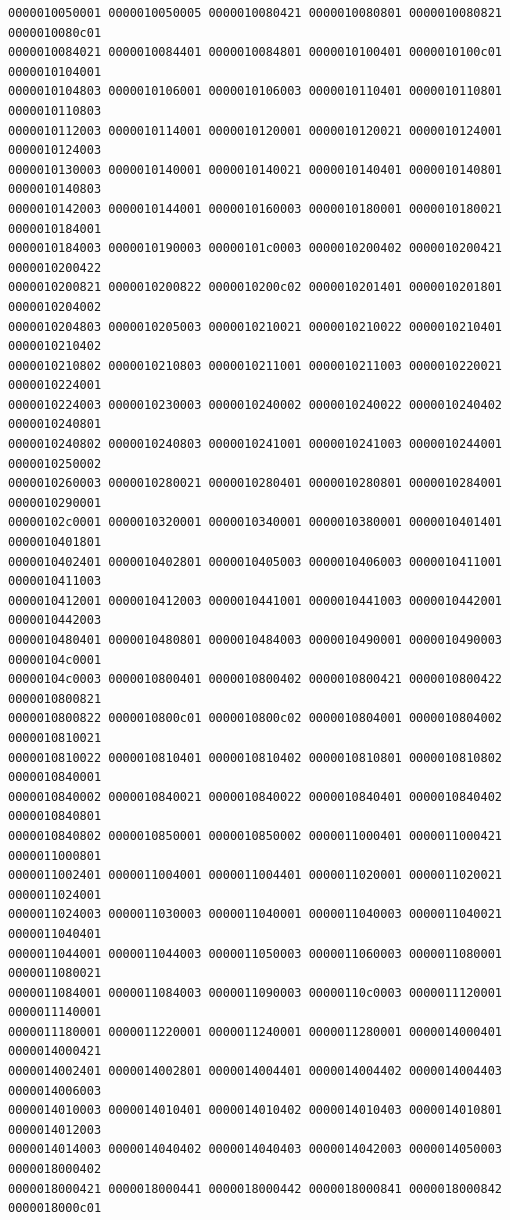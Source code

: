 \begin{Verbatim}[fontsize=\scriptsize]
0000010050001 0000010050005 0000010080421 0000010080801 0000010080821 0000010080c01
0000010084021 0000010084401 0000010084801 0000010100401 0000010100c01 0000010104001
0000010104803 0000010106001 0000010106003 0000010110401 0000010110801 0000010110803
0000010112003 0000010114001 0000010120001 0000010120021 0000010124001 0000010124003
0000010130003 0000010140001 0000010140021 0000010140401 0000010140801 0000010140803
0000010142003 0000010144001 0000010160003 0000010180001 0000010180021 0000010184001
0000010184003 0000010190003 00000101c0003 0000010200402 0000010200421 0000010200422
0000010200821 0000010200822 0000010200c02 0000010201401 0000010201801 0000010204002
0000010204803 0000010205003 0000010210021 0000010210022 0000010210401 0000010210402
0000010210802 0000010210803 0000010211001 0000010211003 0000010220021 0000010224001
0000010224003 0000010230003 0000010240002 0000010240022 0000010240402 0000010240801
0000010240802 0000010240803 0000010241001 0000010241003 0000010244001 0000010250002
0000010260003 0000010280021 0000010280401 0000010280801 0000010284001 0000010290001
00000102c0001 0000010320001 0000010340001 0000010380001 0000010401401 0000010401801
0000010402401 0000010402801 0000010405003 0000010406003 0000010411001 0000010411003
0000010412001 0000010412003 0000010441001 0000010441003 0000010442001 0000010442003
0000010480401 0000010480801 0000010484003 0000010490001 0000010490003 00000104c0001
00000104c0003 0000010800401 0000010800402 0000010800421 0000010800422 0000010800821
0000010800822 0000010800c01 0000010800c02 0000010804001 0000010804002 0000010810021
0000010810022 0000010810401 0000010810402 0000010810801 0000010810802 0000010840001
0000010840002 0000010840021 0000010840022 0000010840401 0000010840402 0000010840801
0000010840802 0000010850001 0000010850002 0000011000401 0000011000421 0000011000801
0000011002401 0000011004001 0000011004401 0000011020001 0000011020021 0000011024001
0000011024003 0000011030003 0000011040001 0000011040003 0000011040021 0000011040401
0000011044001 0000011044003 0000011050003 0000011060003 0000011080001 0000011080021
0000011084001 0000011084003 0000011090003 00000110c0003 0000011120001 0000011140001
0000011180001 0000011220001 0000011240001 0000011280001 0000014000401 0000014000421
0000014002401 0000014002801 0000014004401 0000014004402 0000014004403 0000014006003
0000014010003 0000014010401 0000014010402 0000014010403 0000014010801 0000014012003
0000014014003 0000014040402 0000014040403 0000014042003 0000014050003 0000018000402
0000018000421 0000018000441 0000018000442 0000018000841 0000018000842 0000018000c01

\end{Verbatim}
